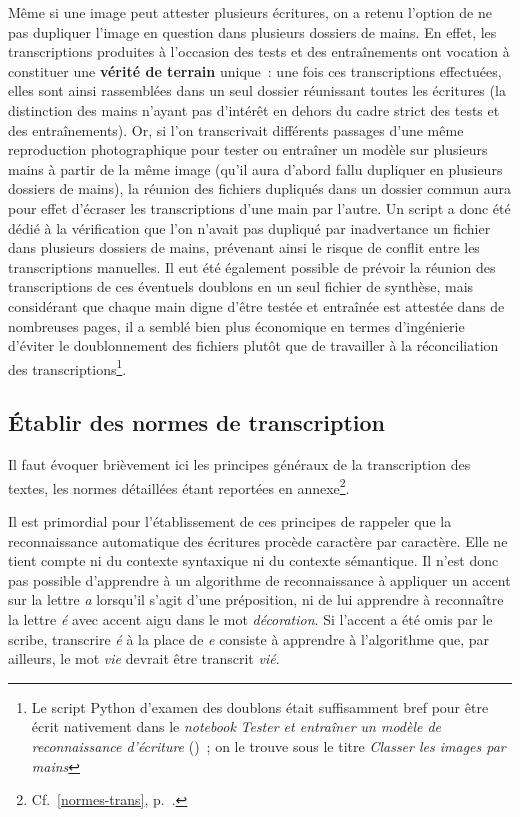 \documentclass[a4paper,12pt,twoside]{book}
\begin{document}
				Même si une image peut attester plusieurs écritures, on a retenu l'option de ne pas dupliquer l'image en question dans plusieurs dossiers de mains. En effet, les transcriptions produites à l'occasion des tests et des entraînements ont vocation à constituer une \textbf{vérité de terrain} unique~: une fois ces transcriptions effectuées, elles sont ainsi rassemblées dans un seul dossier réunissant toutes les écritures (la distinction des mains n'ayant pas d'intérêt en dehors du cadre strict des tests et des entraînements). Or, si l'on transcrivait différents passages d'une même reproduction photographique pour tester ou entraîner un modèle sur plusieurs mains à partir de la même image (qu'il aura d'abord fallu dupliquer en plusieurs dossiers de mains), la réunion des fichiers dupliqués dans un dossier commun aura pour effet d'écraser les transcriptions d'une main par l'autre. Un script a donc été dédié à la vérification que l'on n'avait pas dupliqué par inadvertance un fichier dans plusieurs dossiers de mains, prévenant ainsi le risque de conflit entre les transcriptions manuelles. Il eut été également possible de prévoir la réunion des transcriptions de ces éventuels doublons en un seul fichier de synthèse, mais considérant que chaque main digne d'être testée et entraînée est attestée dans de nombreuses pages, il a semblé bien plus économique en termes d'ingénierie d'éviter le doublonnement des fichiers plutôt que de travailler à la réconciliation des transcriptions\footnote{Le script Python d'examen des doublons était suffisamment bref pour être écrit nativement dans le \textit{notebook} \textit{Tester et entraîner un modèle de reconnaissance d'écriture} (\cite{biayTesterEntrainerModele2022})~; on le trouve sous le titre \textit{Classer les images par mains}}.

			\subsection{Établir des normes de transcription}
				Il faut évoquer brièvement ici les principes généraux de la transcription des textes, les normes détaillées étant reportées en annexe\footnote{Cf.~\ref{normes-trans}, p.~\pageref{normes-trans}.}.
				
				Il est primordial pour l'établissement de ces principes de rappeler que la reconnaissance automatique des écritures procède caractère par caractère. Elle ne tient compte ni du contexte syntaxique ni du contexte sémantique. Il n'est donc pas possible d'apprendre à un algorithme de reconnaissance à appliquer un accent sur la lettre \textit{a} lorsqu'il s'agit d'une préposition, ni de lui apprendre à reconnaître la lettre \textit{é} avec accent aigu dans le mot \textit{décoration}. Si l'accent a été omis par le scribe, transcrire \textit{é} à la place de \textit{e} consiste à apprendre à l'algorithme que, par ailleurs, le mot \textit{vie} devrait être transcrit \textit{vié}.
				
\end{document}

